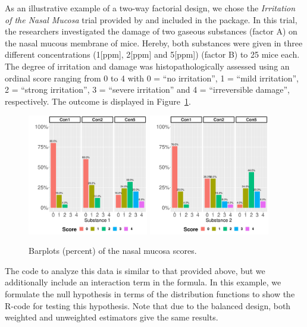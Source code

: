 As an illustrative example of a two-way factorial design, we chose the 
\textit{Irritation of the Nasal Mucosa} trial provided by 
\citet[Chapter~B.3.2]{brunner2019rank} and included in the package. In this trial, the researchers 
investigated the damage of two gaseous substances (factor A) on the nasal 
mucous membrane of mice. Hereby, both substances were given in three different 
concentrations (1[ppm], 2[ppm] and 5[ppm]) (factor B) to 25 mice each. The 
degree of irritation and damage was histopathologically assessed using an 
ordinal score ranging from 0 to 4 with 0 = ``no irritation'', 1 = ``mild 
irritation'', 2 = ``strong irritation'', 3 = ``severe irritation'' and 4 = 
``irreversible damage'', respectively. The outcome is displayed in Figure~\ref{fig:nms}.
\begin{figure}[t!]
	\centering
	\includegraphics[width=0.47\textwidth]{barplot_nms1}
		\includegraphics[width=0.47\textwidth]{barplot_nms2}
	\caption{\label{fig:nms} Barplots (percent) of the nasal mucosa scores.}
\end{figure}
The code to analyze this data is similar 
to that provided above, but we additionally include an interaction term in the 
formula. In this example, we formulate  the null hypothesis in terms of the distribution functions to show the R-code for testing this hypothesis. Note that due to the balanced design, both weighted and unweighted estimators give the same results.
